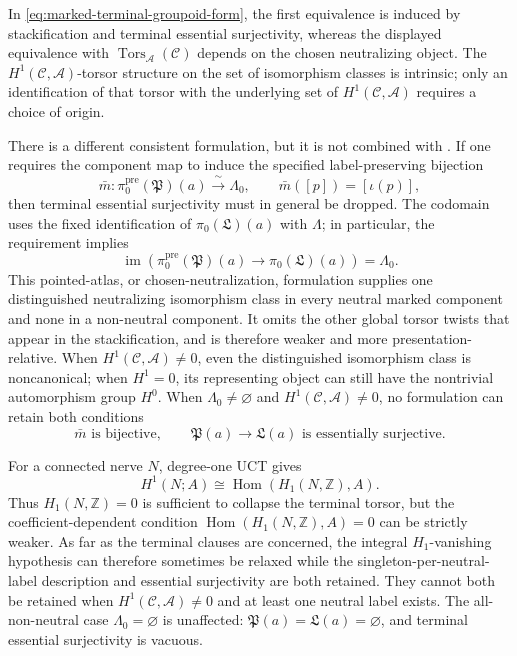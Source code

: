 In \eqref{eq:marked-terminal-groupoid-form}, the first equivalence is induced
by stackification and terminal essential surjectivity, whereas the displayed
equivalence with \(\operatorname{Tors}_{\mathscr A}(\mathcal C)\) depends on
the chosen neutralizing object.  The \(H^1(\mathcal C,\mathscr A)\)-torsor
structure on the set of isomorphism classes is intrinsic; only an
identification of that torsor with the underlying set of
\(H^1(\mathcal C,\mathscr A)\) requires a choice of origin.

\begin{remark}
\label{rem:pointed-atlas-terminal-form}
There is a different consistent formulation, but it is not combined with
.  If one requires the component map to
induce the specified label-preserving bijection
\[
 \bar m:\pi_0^{\mathrm{pre}}(\mathfrak P)(a)
 \xrightarrow{\ \sim\ }\Lambda_0,
 \qquad
 \bar m([p])=[\iota(p)],
\]
then terminal essential surjectivity must in general be dropped.  The
codomain uses the fixed identification of
\(\pi_0(\mathfrak L)(a)\) with \(\Lambda\); in particular, the requirement
implies
\[
 \operatorname{im}\!\left(
 \pi_0^{\mathrm{pre}}(\mathfrak P)(a)
 \longrightarrow \pi_0(\mathfrak L)(a)
 \right)=\Lambda_0.
\]
This pointed-atlas, or chosen-neutralization, formulation supplies one
distinguished neutralizing isomorphism class in every neutral marked
component and none in a non-neutral component.  It omits the other global
torsor twists that appear in the stackification, and is therefore weaker and
more presentation-relative.  When \(H^1(\mathcal C,\mathscr A)\ne0\), even
the distinguished isomorphism class is noncanonical; when \(H^1=0\), its
representing object can still have the nontrivial automorphism group \(H^0\).
When \(\Lambda_0\ne\varnothing\) and
\(H^1(\mathcal C,\mathscr A)\ne0\), no formulation can retain both conditions
\[
 \bar m\text{ is bijective},
 \qquad
 \mathfrak P(a)\to\mathfrak L(a)\text{ is essentially surjective}.
\]
\end{remark}

\begin{remark}
\label{rem:terminal-torsor-coefficient-threshold}
For a connected nerve \(N\), degree-one UCT gives
\[
 H^1(N;A)\cong\operatorname{Hom}(H_1(N,\mathbb Z),A).
\]
Thus \(H_1(N,\mathbb Z)=0\) is sufficient to collapse the terminal torsor,
but the coefficient-dependent condition
\(\operatorname{Hom}(H_1(N,\mathbb Z),A)=0\) can be strictly weaker.  As far as the
terminal clauses are concerned, the integral
\(H_1\)-vanishing hypothesis can therefore sometimes be relaxed while the
singleton-per-neutral-label description and essential surjectivity are both
retained.  They cannot both be retained when
\(H^1(\mathcal C,\mathscr A)\ne0\) and at least one neutral label exists.
The all-non-neutral case \(\Lambda_0=\varnothing\) is unaffected:
\(\mathfrak P(a)=\mathfrak L(a)=\varnothing\), and terminal essential
surjectivity is vacuous.
\end{remark}


